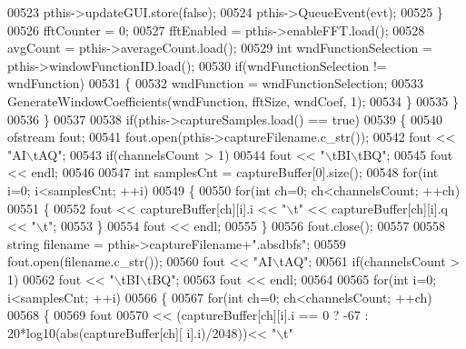 \begin{DoxyCode}
{{{00523                 pthis->updateGUI.store(\textcolor{keyword}{false});
00524                 pthis->QueueEvent(evt);
00525             \}
00526             fftCounter = 0;
00527             fftEnabled = pthis->enableFFT.load();
00528             avgCount = pthis->averageCount.load();
00529             \textcolor{keywordtype}{int} wndFunctionSelection = pthis->windowFunctionID.load();
00530             \textcolor{keywordflow}{if}(wndFunctionSelection != wndFunction)
00531             \{
00532                 wndFunction = wndFunctionSelection;
00533                 GenerateWindowCoefficients(wndFunction, fftSize, wndCoef, 1);
00534             \}
00535         \}
00536     \}
00537 
00538     \textcolor{keywordflow}{if}(pthis->captureSamples.load() == \textcolor{keyword}{true})
00539     \{
00540         ofstream fout;
00541         fout.open(pthis->captureFilename.c\_str());
00542         fout << \textcolor{stringliteral}{"AI\(\backslash\)tAQ"};
00543         \textcolor{keywordflow}{if}(channelsCount > 1)
00544             fout << \textcolor{stringliteral}{"\(\backslash\)tBI\(\backslash\)tBQ"};
00545         fout << endl;
00546 
00547         \textcolor{keywordtype}{int} samplesCnt = captureBuffer[0].size();
00548         \textcolor{keywordflow}{for}(\textcolor{keywordtype}{int} i=0; i<samplesCnt; ++i)
00549         \{
00550             \textcolor{keywordflow}{for}(\textcolor{keywordtype}{int} ch=0; ch<channelsCount; ++ch)
00551             \{
00552                 fout << captureBuffer[ch][i].i << \textcolor{stringliteral}{"\(\backslash\)t"} << captureBuffer[ch][i].q << \textcolor{stringliteral}{"\(\backslash\)t"};
00553             \}
00554             fout << endl;
00555         \}
00556         fout.close();
00557 
00558         \textcolor{keywordtype}{string} filename = pthis->captureFilename+\textcolor{stringliteral}{".absdbfs"};
00559         fout.open(filename.c\_str());
00560         fout << \textcolor{stringliteral}{"AI\(\backslash\)tAQ"};
00561         \textcolor{keywordflow}{if}(channelsCount > 1)
00562             fout << \textcolor{stringliteral}{"\(\backslash\)tBI\(\backslash\)tBQ"};
00563         fout << endl;
00564 
00565         \textcolor{keywordflow}{for}(\textcolor{keywordtype}{int} i=0; i<samplesCnt; ++i)
00566         \{
00567             \textcolor{keywordflow}{for}(\textcolor{keywordtype}{int} ch=0; ch<channelsCount; ++ch)
00568             \{
00569                 fout
00570                 << (captureBuffer[ch][i].i == 0 ? -67 : 20*log10(abs(captureBuffer[ch][
      i].i)/2048))<< \textcolor{stringliteral}{"\(\backslash\)t"}
}}}
\end{DoxyCode}
